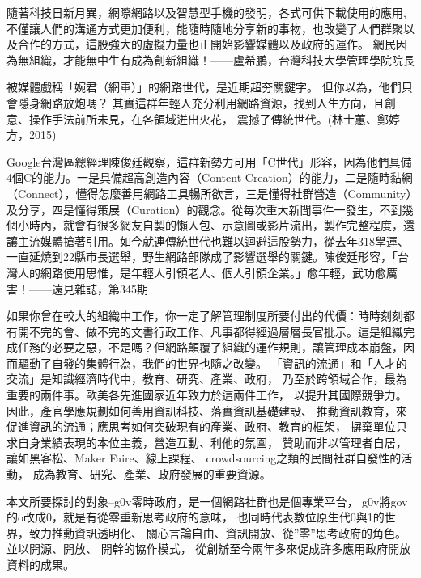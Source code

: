 隨著科技日新月異，網際網路以及智慧型手機的發明，各式可供下載使用的應用, 不僅讓人們的溝通方式更加便利，能隨時隨地分享新的事物，也改變了人們群聚以及合作的方式，這股強大的虛擬力量也正開始影響媒體以及政府的運作。
網民因為無組織，才能無中生有成為創新組織！——盧希鵬，台灣科技大學管理學院院長







被媒體戲稱「婉君（網軍）」的網路世代，是近期超夯關鍵字。
但你以為，他們只會隱身網路放炮嗎？
其實這群年輕人充分利用網路資源，找到人生方向，且創意、操作手法前所未見，在各領域迸出火花，
震撼了傳統世代。(林士蕙、鄭婷方，2015)

Google台灣區總經理陳俊廷觀察，這群新勢力可用「C世代」形容，因為他們具備4個C的能力。一是具備超高創造內容（Content Creation）的能力，二是隨時黏網（Connect），懂得怎麼善用網路工具暢所欲言，三是懂得社群營造（Community）及分享，四是懂得策展（Curation）的觀念。從每次重大新聞事件一發生，不到幾個小時內，就會有很多網友自製的懶人包、示意圖或影片流出，製作完整程度，還讓主流媒體搶著引用。如今就連傳統世代也難以迴避這股勢力，從去年318學運、一直延燒到22縣市長選舉，野生網路部隊成了影響選舉的關鍵。陳俊廷形容，「台灣人的網路使用思惟，是年輕人引領老人、個人引領企業。」愈年輕，武功愈厲害！——遠見雜誌，第345期


如果你曾在較大的組織中工作，你一定了解管理制度所要付出的代價：時時刻刻都有開不完的會、做不完的文書行政工作、凡事都得經過層層長官批示。這是組織完成任務的必要之惡，不是嗎？但網路顛覆了組織的運作規則，讓管理成本崩盤，因而驅動了自發的集體行為，我們的世界也隨之改變。
「資訊的流通」和「人才的交流」是知識經濟時代中，教育、研究、產業、政府，
乃至於跨領域合作，最為重要的兩件事。歐美各先進國家近年致力於這兩件工作，
以提升其國際競爭力。因此，產官學應規劃如何善用資訊科技、落實資訊基礎建設、
推動資訊教育，來促進資訊的流通；應思考如何突破現有的產業、政府、教育的框架，
摒棄單位只求自身業績表現的本位主義，營造互動、利他的氛圍，
贊助而非以管理者自居，讓如黑客松、Maker Faire、線上課程、
crowdsourcing之類的民間社群自發性的活動，
成為教育、研究、產業、政府發展的重要資源。


本文所要探討的對象--g0v零時政府，是一個網路社群也是個專業平台， 
g0v將gov的o改成0，就是有從零重新思考政府的意味，
也同時代表數位原生代0與1的世界，致力推動資訊透明化、
關心言論自由、資訊開放、從”零”思考政府的角色。並以開源、開放、
開幹的協作模式， 從創辦至今兩年多來促成許多應用政府開放資料的成果。

